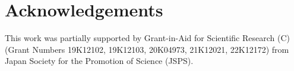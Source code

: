 \section*{Acknowledgements}
This work was partially supported by Grant-in-Aid for Scientific Research (C) (Grant Numbers 19K12102, 19K12103, 20K04973, 21K12021, 22K12172) from Japan Society for the Promotion of Science (JSPS).